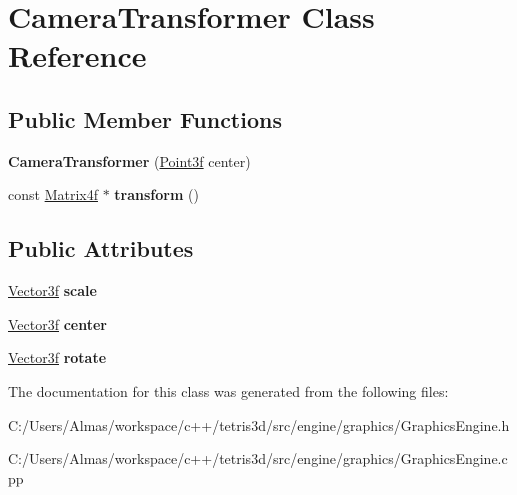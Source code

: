 \hypertarget{class_camera_transformer}{\section{Camera\-Transformer Class Reference}
\label{class_camera_transformer}
}
\subsection*{Public Member Functions}
\begin{DoxyCompactItemize}
\item 
\hypertarget{class_camera_transformer_a28c05d41498e09efb37106e39c6a607e}{{\bfseries Camera\-Transformer} (\hyperlink{struct_point3f}{Point3f} center)}\label{class_camera_transformer_a28c05d41498e09efb37106e39c6a607e}

\item 
\hypertarget{class_camera_transformer_aabd6a540fbbf191c658cc12a2071b674}{const \hyperlink{class_matrix4f}{Matrix4f} $\ast$ {\bfseries transform} ()}\label{class_camera_transformer_aabd6a540fbbf191c658cc12a2071b674}

\end{DoxyCompactItemize}
\subsection*{Public Attributes}
\begin{DoxyCompactItemize}
\item 
\hypertarget{class_camera_transformer_a06c59d9b33e28263e80ac7e54474d90d}{\hyperlink{struct_vector3f}{Vector3f} {\bfseries scale}}\label{class_camera_transformer_a06c59d9b33e28263e80ac7e54474d90d}

\item 
\hypertarget{class_camera_transformer_aea0a1f518d8c69653f8dbdbd81ea668d}{\hyperlink{struct_vector3f}{Vector3f} {\bfseries center}}\label{class_camera_transformer_aea0a1f518d8c69653f8dbdbd81ea668d}

\item 
\hypertarget{class_camera_transformer_ab729cf0f95cefb227001dbb9d52bc428}{\hyperlink{struct_vector3f}{Vector3f} {\bfseries rotate}}\label{class_camera_transformer_ab729cf0f95cefb227001dbb9d52bc428}

\end{DoxyCompactItemize}


The documentation for this class was generated from the following files\-:\begin{DoxyCompactItemize}
\item 
C\-:/\-Users/\-Almas/workspace/c++/tetris3d/src/engine/graphics/Graphics\-Engine.\-h\item 
C\-:/\-Users/\-Almas/workspace/c++/tetris3d/src/engine/graphics/Graphics\-Engine.\-cpp\end{DoxyCompactItemize}
